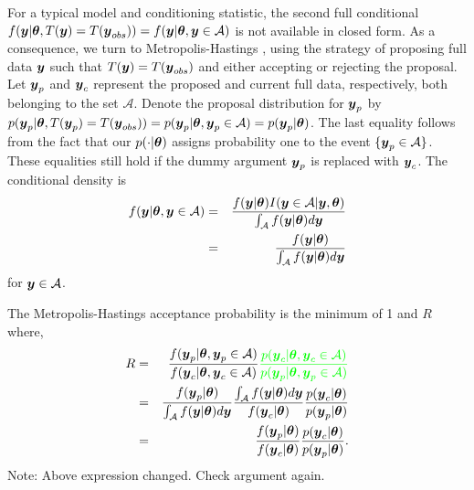 \documentclass[11pt]{article}
\def\bth{\mbox{\boldmath $\theta$}}
\newcommand{\by}{\mbox{\boldmath $y$}}
\newcommand{\mc}{\mathcal}
\newcommand{\red}[1]{{\color{red}#1}}
\newcommand{\green}[1]{{\color{green}#1}}
\begin{document}
For a typical model and conditioning statistic, the second full conditional $f(\by|\bth, T(\by)=T(\by_{obs})) =f(\by|\bth, \by\in\mc A)$ is not available in closed form.  As a consequence, we turn to Metropolis-Hastings \citep{hastings1970},
using the strategy of proposing full data $\by$ such that $T(\by) = T(\by_{obs})$ and either accepting or rejecting the
proposal. Let $\by_p$ and  $\by_c$ represent the proposed and current
full data, respectively, both belonging to the set $\mathcal{A}$. Denote the proposal distribution for $\by_{p}$ by $p(\by_p|\bth,T(\by_p) = T(\by_{obs}))  = p(\by_p|\bth,\by_p \in \mathcal{A}) = p(\by_p | \bth)$.  The last equality follows from the fact that our $p(\cdot | \bth)$ assigns probability one to the event $\{ \by_p \in \mathcal{A} \}$.  These equalities still hold if the dummy argument $\by_p$ is replaced with $\by_c$.  The conditional density is
\begin{eqnarray*}
f(\by | \bth, \by \in \mathcal{A}) & = & \frac{f(\by | \bth) I(\by \in \mathcal{A} | \by, \bth)}{\int_\mathcal{A} f(\by | \bth) d\by} \\
     & = & \frac{f(\by | \bth)}{\int_\mathcal{A} f(\by | \bth) d\by} 
\end{eqnarray*}
for $\by \in \mathcal{A}$.   


The Metropolis-Hastings acceptance probability  is the minimum of 1 and $R$ where,
\begin{eqnarray}
\label{MHRatio}
R & = & \frac{f(\by_p|\bth,\by_p \in \mathcal{A})}{f(\by_c|\bth,\by_c \in \mathcal{A})}  
                \green{\frac{p(\by_c|\bth, \by_c \in \mathcal{A})}{p(\by_p|\bth,\by_p \in \mathcal{A})}} \\
  & = & \frac{f(\by_p | \bth)}{\int_\mathcal{A} f(\by | \bth) d\by} \frac{\int_\mathcal{A} f(\by | \bth) d\by}{f(\by_c | \bth)} \frac{p(\by_c | \bth)}{p(\by_p | \bth)} \\
 & = & \frac{f(\by_p|\bth)}{f(\by_c|\bth)} \frac{p(\by_c|\bth)}{p(\by_p|\bth)} .  
\end{eqnarray}
\green{Note:  Above expression changed.  Check argument again.}
\end{document}

